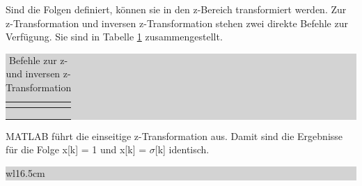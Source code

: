 \noindent Sind die Folgen definiert, k\"{o}nnen sie in den z-Bereich transformiert werden. Zur z-Transformation und inversen z-Transformation stehen zwei direkte Befehle zur Verf\"{u}gung. Sie sind in Tabelle \ref{tab:fiveeight} zusammengestellt.

\begin{table}[H]
\setlength{\arrayrulewidth}{.1em}
\caption{Befehle zur z- und inversen z-Transformation}
\setlength{\fboxsep}{0pt}%
\colorbox{lightgray}{%
%
\begin{tabular}{| c | c |}
\hline
\parbox[c][0.35in][c]{1.5in}{\smallskip\centering\textbf{\selectfont{Befehl}}} & \parbox[c][0.35in][c]{5in}{\smallskip\centering\textbf{\selectfont{Beschreibung}}}\\ \hline

\parbox[c][0.8in][c]{1.5in}{} & 
\parbox[c][0.8in][c]{5in}{}\\ \hline

\parbox[c][0.4in][c]{1.5in}{} & 
\parbox[c][0.4in][c]{5in}{}\\ \hline

\parbox[c][0.8in][c]{1.5in}{} & 
\parbox[c][0.8in][c]{5in}{}\\ \hline

\end{tabular}%
}
\label{tab:fiveeight}
\end{table}

\noindent MATLAB f\"{u}hrt die einseitige z-Transformation aus. Damit sind die Ergebnisse f\"{u}r die Folge x[k] = 1 und x[k] = $\sigma$[k] identisch. \bigskip

\noindent
\colorbox{lightgray}{%
%
\renewcommand\arraystretch{0.6}%
\begin{tabular}{ wl{16.5cm} }
{\selectfont{Beispiel: z-Transformation mit MATLAB}}
\end{tabular}%
}\medskip

